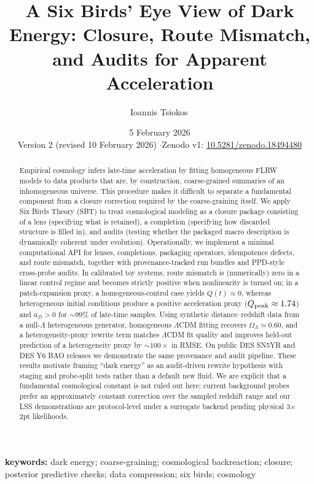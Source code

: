 \documentclass[11pt]{article}
\title{A Six Birds' Eye View of Dark Energy: Closure, Route Mismatch, and Audits for Apparent Acceleration}
\author{Ioannis Tsiokos\,\orcidlink{0009-0009-7659-5964}}
\affiliation{}
\date{5 February 2026\\[4pt]{\small Version 2 (revised 10 February 2026) \quad$\cdot$\quad Zenodo v1: \href{https://doi.org/10.5281/zenodo.18494480}{10.5281/zenodo.18494480}}}
\makeatletter
\newcommand{\printaffiliation}{\begin{center}\small \@affiliation\end{center}}
\theoremstyle{definition}
\theoremstyle{plain}
\theoremstyle{remark}
\makeatother
\begin{document}
\maketitle
\thispagestyle{firstpage}
\printaffiliation

\begin{abstract}
Empirical cosmology infers late-time acceleration by fitting homogeneous FLRW models to data products that are, by construction, coarse-grained summaries of an inhomogeneous universe. This procedure makes it difficult to separate a fundamental component from a closure correction required by the coarse-graining itself. We apply Six Birds Theory (SBT) to treat cosmological modeling as a closure package consisting of a lens (specifying what is retained), a completion (specifying how discarded structure is filled in), and audits (testing whether the packaged macro description is dynamically coherent under evolution). Operationally, we implement a minimal computational API for lenses, completions, packaging operators, idempotence defects, and route mismatch, together with provenance-tracked run bundles and PPD-style cross-probe audits. In calibrated toy systems, route mismatch is (numerically) zero in a linear control regime and becomes strictly positive when nonlinearity is turned on; in a patch-expansion proxy, a homogeneous-control case yields $Q(t)\approx 0$, whereas heterogeneous initial conditions produce a positive acceleration proxy ($Q_{\rm peak}\approx 1.74$) and $\ddot a_{\mathcal{D}}>0$ for $\sim 99\%$ of late-time samples. Using synthetic distance--redshift data from a null-$\Lambda$ heterogeneous generator, homogeneous $\Lambda$CDM fitting recovers $\Omega_\Lambda\simeq 0.60$, and a heterogeneity-proxy rewrite term matches $\Lambda$CDM fit quality and improves held-out prediction of a heterogeneity proxy by $\sim 100\times$ in RMSE. On public DES SN5YR and DES Y6 BAO releases we demonstrate the same provenance and audit pipeline. These results motivate framing ``dark energy'' as an audit-driven rewrite hypothesis with staging and probe-split tests rather than a default new fluid. We are explicit that a fundamental cosmological constant is not ruled out here; current background probes prefer an approximately constant correction over the sampled redshift range and our LSS demonstrations are protocol-level under a surrogate backend pending physical 3$\times$2pt likelihoods.
\end{abstract}
\noindent\textbf{keywords:} dark energy; coarse-graining; cosmological backreaction; closure; posterior predictive checks; data compression; six birds; cosmology
\end{document}
